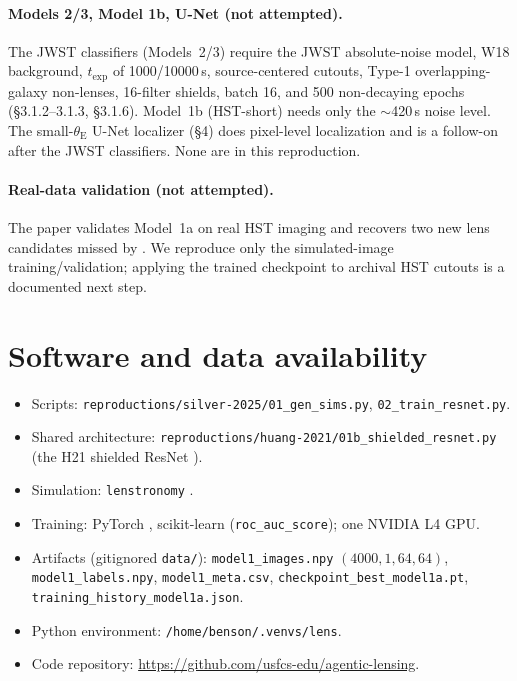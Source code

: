\documentclass[11pt,letterpaper]{article}
\newcommand{\thetaE}{\ensuremath{\theta_{\mathrm{E}}}}
\newcommand{\texp}{\ensuremath{t_{\mathrm{exp}}}}
\begin{document}
\paragraph{Models 2/3, Model 1b, U-Net (not attempted).} The JWST
classifiers (Models~2/3) require the JWST absolute-noise model, W18
background, $\texp$ of 1000/10000\,s, source-centered cutouts, Type-1
overlapping-galaxy non-lenses, 16-filter shields, batch 16, and 500
non-decaying epochs (\S3.1.2--3.1.3, \S3.1.6). Model~1b (HST-short) needs
only the $\sim$420\,s noise level. The small-$\thetaE$ U-Net localizer
(\S4) does pixel-level localization and is a follow-on after the JWST
classifiers. None are in this reproduction.

\paragraph{Real-data validation (not attempted).} The paper validates
Model~1a on real HST imaging and recovers two new lens candidates missed
by \citet{garvin2022spacewarps}. We reproduce only the simulated-image
training/validation; applying the trained checkpoint to archival HST
cutouts is a documented next step.

\section{Software and data availability}

\begin{itemize}
\item Scripts: \texttt{reproductions/silver-2025/01\_gen\_sims.py},
      \texttt{02\_train\_resnet.py}.
\item Shared architecture:
      \texttt{reproductions/huang-2021/01b\_shielded\_resnet.py}
      (the H21 shielded ResNet \autocite{huang2021desi}).
\item Simulation: \texttt{lenstronomy}
      \autocite{birrer2018lenstronomy,birrer2021lenstronomy2}.
\item Training: PyTorch \autocite{paszke2019pytorch}, scikit-learn
      (\texttt{roc\_auc\_score}); one NVIDIA L4 GPU.
\item Artifacts (gitignored \texttt{data/}):
      \texttt{model1\_images.npy} $(4000,1,64,64)$,
      \texttt{model1\_labels.npy}, \texttt{model1\_meta.csv},
      \texttt{checkpoint\_best\_model1a.pt},
      \texttt{training\_history\_model1a.json}.
\item Python environment: \texttt{/home/benson/.venvs/lens}.
\item Code repository: \url{https://github.com/usfcs-edu/agentic-lensing}.
\end{itemize}
\end{document}
